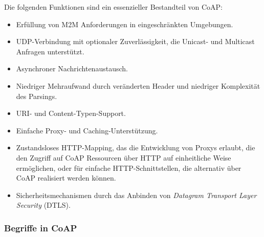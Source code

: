 Die folgenden Funktionen sind ein essenzieller Bestandteil von CoAP:
\begin{itemize}
    \item Erfüllung von M2M Anforderungen in eingeschränkten Umgebungen.
    \item UDP-Verbindung mit optionaler Zuverlässigkeit, die Unicast- und Multicast Anfragen unterstützt.
    \item Asynchroner Nachrichtenaustausch.
    \item Niedriger Mehraufwand durch veränderten Header und niedriger Komplexität des Parsings.
    \item URI- und Content-Typen-Support.
    \item Einfache Proxy- und Caching-Unterstützung.
    \item Zustandsloses HTTP-Mapping, das die Entwicklung von Proxys erlaubt, die den Zugriff auf CoAP Ressourcen über HTTP auf einheitliche Weise ermöglichen, oder für einfache HTTP-Schnittstellen, die alternativ über CoAP realisiert werden können.
    \item Sicherheitsmechanismen durch das Anbinden von \textit{Datagram Transport Layer Security} (DTLS).
\end{itemize}

\subsubsection{Begriffe in CoAP}
\label{subsubsec:begiffe-in-coap}

